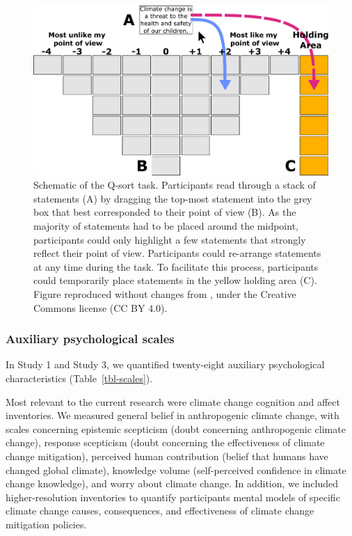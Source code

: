 \documentclass[
  letterpaper,
  DIV=11,
  numbers=noendperiod]{scrartcl}
\begin{document}
\begin{figure}

{\centering \includegraphics[width=1\textwidth,height=\textheight]{qsort.pdf}

}

\caption{\label{fig-qsort}Schematic of the Q-sort task. Participants
read through a stack of statements (A) by dragging the top-most
statement into the grey box that best corresponded to their point of
view (B). As the majority of statements had to be placed around the
midpoint, participants could only highlight a few statements that
strongly reflect their point of view. Participants could re-arrange
statements at any time during the task. To facilitate this process,
participants could temporarily place statements in the yellow holding
area (C). Figure reproduced without changes from \citep{andreotta_2022},
under the Creative Commons license (CC BY 4.0).}

\end{figure}

\hypertarget{auxiliary-psychological-scales}{%
\subsubsection{Auxiliary psychological
scales}\label{auxiliary-psychological-scales}}

In Study 1 and Study 3, we quantified twenty-eight auxiliary
psychological characteristics (Table~\ref{tbl-scales}).

Most relevant to the current research were climate change cognition and
affect inventories. We measured general belief in anthropogenic climate
change, with scales concerning epistemic scepticism (doubt concerning
anthropogenic climate change), response scepticism (doubt concerning the
effectiveness of climate change mitigation), perceived human
contribution (belief that humans have changed global climate), knowledge
volume (self-perceived confidence in climate change knowledge), and
worry about climate change. In addition, we included higher-resolution
inventories to quantify participants mental models of specific climate
change causes, consequences, and effectiveness of climate change
mitigation policies.
\end{document}
